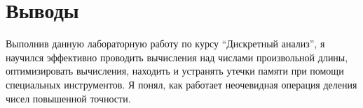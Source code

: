 \section{Выводы}

Выполнив данную лабораторную работу по курсу \enquote{Дискретный анализ}, я научился эффективно проводить вычисления над числами произвольной длины, оптимизировать вычисления, находить и устранять утечки памяти при помощи специальных инструментов. Я понял, как работает неочевидная операция деления чисел повышенной точности.

\pagebreak

